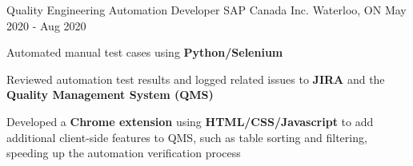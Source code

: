 
\begin{cventries}

  \cventry
    {Quality Engineering Automation Developer} %
    {SAP Canada Inc.} %
    {Waterloo, ON} %
    {May 2020 - Aug 2020} %
    {
      \begin{cvitems} %
        \item {Automated manual test cases using \textbf{Python/Selenium}}
		\item {Reviewed automation test results and logged related issues to \textbf{JIRA} and the \textbf{Quality Management System (QMS)}}
		\item {Developed a \textbf{Chrome extension} using \textbf{HTML/CSS/Javascript} to add additional client-side features to QMS, such as table sorting and filtering, speeding up the automation verification process}
      \end{cvitems}
    }
       
\end{cventries}
